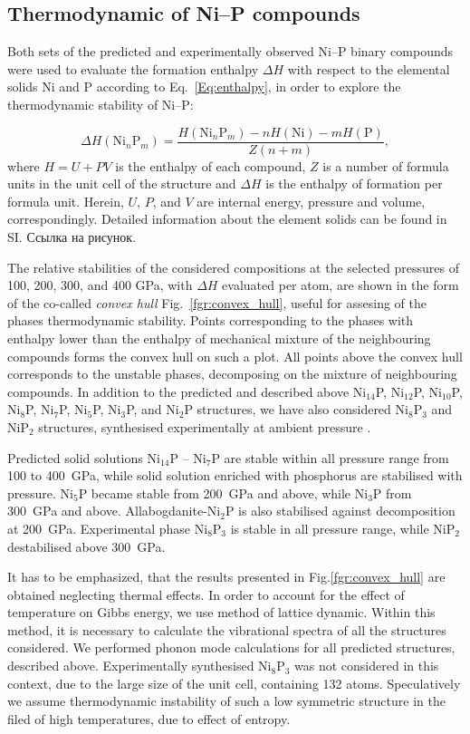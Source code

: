 \documentclass[twoside,twocolumn,9pt]{article}
\begin{document}
\subsection{Thermodynamic of Ni--P compounds}

Both sets of the predicted and experimentally observed Ni--P binary compounds were used to evaluate the formation enthalpy $\Delta H$ with respect to the elemental solids Ni and P according to Eq.~\ref{Eq:enthalpy}, in order to explore the thermodynamic stability of Ni--P:  

\begin{equation}\label{Eq:enthalpy}
 \Delta H(\mathrm{Ni}_n\mathrm{P}_m) = \frac{H(\mathrm{Ni}_n\mathrm{P}_m)-nH(\mathrm{Ni})-mH(\mathrm{P})}{Z(n+m)},
\end{equation} 
where $H=U+PV$ is the enthalpy of each compound, $Z$ is a number of formula units in the unit cell of the structure and $\Delta H$ is the enthalpy of formation per formula unit. 
Herein, $U$, $P$, and $V$ are internal energy, pressure and volume, correspondingly. 
Detailed information about the element solids can be found in SI. Ссылка на рисунок.

The relative stabilities of the considered compositions at the selected pressures of 100, 200, 300, and 400 GPa, with $\Delta H$ evaluated per atom, are shown in the form of the co-called {\it convex hull} Fig.~\ref{fgr:convex_hull}, useful for assesing of the phases thermodynamic stability. 
Points corresponding to the phases with enthalpy lower than the enthalpy of mechanical mixture of the neighbouring compounds forms the convex hull on such a plot.
All points above the convex hull corresponds to the unstable phases, decomposing on the mixture of neighbouring compounds.
In addition to the predicted and described above Ni$_{14}$P, Ni$_{12}$P, Ni$_{10}$P, Ni$_8$P, Ni$_7$P, Ni$_5$P, Ni$_3$P, and Ni$_2$P structures, we have also considered Ni$_8$P$_3$ and NiP$_2$ structures, synthesised experimentally at ambient pressure \cite{}.

Predicted solid solutions Ni$_{14}$P -- Ni$_7$P are stable within all pressure range from 100 to 400~GPa, while solid solution enriched with phosphorus are stabilised with pressure.
Ni$_5$P became stable from  200~GPa and above, while Ni$_3$P from 300~GPa and above. Allabogdanite-Ni$_2$P is also stabilised against decomposition at 200~GPa.
Experimental phase Ni$_8$P$_3$ is stable in all pressure range, while NiP$_2$ destabilised above 300~GPa.

It has to be emphasized, that the results presented in Fig.\ref{fgr:convex_hull} are obtained neglecting thermal effects. 
In order to account for the effect of temperature on Gibbs energy, we use method of lattice dynamic.
Within this method, it is necessary to calculate the vibrational spectra of all the structures considered. 
We performed phonon mode calculations for all predicted structures, described above. 
Experimentally synthesised Ni$_8$P$_3$ was not considered in this context, due to the large size of the unit cell, containing 132 atoms.
Speculatively we assume thermodynamic instability of such a low symmetric structure in the filed of high temperatures, due to effect of entropy.
\end{document}

